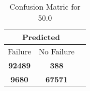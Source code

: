 \begin{table}[] 
\caption{Confusion Matric for 50.0} 
\label{Table: Prediction Accuracy-DMD50.0OnlySunEKF-ignoreReflectionEKF-top2perfectNoFailurePrediction-Reflection} 
\centering 
\begin{tabular} 
 {@{}ccc@{}} 
\toprule 
\multicolumn{2}{c}{\textbf{Predicted}}
 \\ \midrule 
\multicolumn{1}{|c|}{Failure} & 
\multicolumn{1}{c|}{No Failure}
 \\ \midrule 
\multicolumn{1}{|c|}{\color{green}\textbf{92489}} & 
\multicolumn{1}{c|}{\color{red}\textbf{388}}
 \\ \midrule 
\multicolumn{1}{|c|}{\color{red}\textbf{9680}} & 
\multicolumn{1}{c|}{\color{green}\textbf{67571}}
 \\ \bottomrule 
\end{tabular} 
\end{table} 

